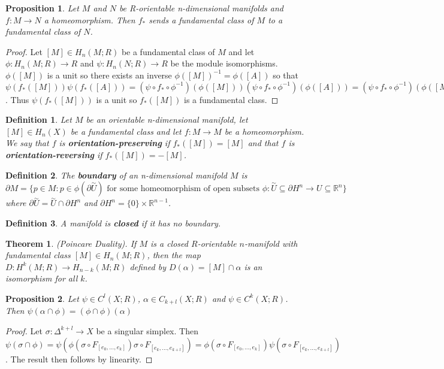 \documentclass{report}
\newtheorem{definition}{Definition}
\newtheorem{theorem}{Theorem}
\newtheorem{proposition}{Proposition}
\begin{document}
\begin{proposition}
Let $M$ and $N$ be R-orientable n-dimensional manifolds and $f\colon M\to N$ a homeomorphism. Then $f_*$ sends a fundamental class of $M$ to a fundamental class of $N$.
\end{proposition}
\begin{proof}
Let $[M]\in H_n(M;R)$ be a fundamental class of $M$ and let $\phi\colon H_n(M;R)\to R$ and $\psi\colon H_n(N;R)\to R$ be the module isomorphisms. $\phi([M])$ is a unit so there exists an inverse $\phi([M])^{-1}=\phi([A])$ so that $\psi(f_*([M]))\psi(f_*([A]))=(\psi\circ f_*\circ \phi^{-1})(\phi([M]))(\psi\circ f_*\circ \phi^{-1})(\phi([A]))=(\psi\circ f_*\circ \phi^{-1})(\phi([M])\phi([A]))=(\psi\circ f_*\circ \phi^{-1})(1)=1$. Thus $\psi(f_*([M]))$ is a unit so $f_*([M])$ is a fundamental class.
\end{proof}

\begin{definition}
Let $M$ be an orientable n-dimensional manifold, let $[M]\in H_n(X)$ be a fundamental class and let $f\colon M\to M$ be a homeomorphism. We say that $f$ is \textbf{orientation-preserving} if $f_*([M])=[M]$ and that $f$ is \textbf{orientation-reversing} if $f_*([M])=-[M]$.
\end{definition}

\begin{definition}
The \textbf{boundary} of an n-dimensional manifold $M$ is $\partial M=\{p\in M:p\in\phi(\partial\overset{\sim}{U})\text{ for some homeomorphism of open subsets }\phi:\overset{\sim}{U}\subseteq\partial H^n\to U\subseteq \mathbb{R}^n\}$ where $\partial\overset{\sim}{U}=\overset{\sim}{U}\cap\partial H^n$ and $\partial H^n=\{0\}\times\mathbb{R}^{n-1}$.
\end{definition}

\begin{definition}
A manifold is \textbf{closed} if it has no boundary.
\end{definition}

\begin{theorem}
(Poincare Duality). If $M$ is a closed $R$-orientable $n$-manifold with fundamental class $[M]\in H_n(M;R)$, then the map $D\colon H^k(M;R)\to H_{n-k}(M;R)$ defined by $D(\alpha)=[M]\cap\alpha$ is an isomorphism for all $k$.
\end{theorem}

\begin{proposition}
Let $\psi\in C^l(X;R)$, $\alpha\in C_{k+l}(X;R)$ and $\psi\in C^k(X;R)$. Then $\psi(\alpha\cap\phi)=(\phi\cap\phi)(\alpha)$
\end{proposition}
\begin{proof}
Let $\sigma\colon\Delta^{k+l}\to X$ be a singular simplex. Then $\psi(\sigma\cap\phi)=\psi(\phi(\sigma\circ F_{[e_0,...,e_k]})\sigma\circ F_{[e_k,...,e_{k+l}]})=\phi(\sigma\circ F_{[e_0,...,e_k]})\psi(\sigma\circ F_{[e_k,...,e_{k+l}]})$.
The result then follows by linearity.
\end{proof}
\end{document}
